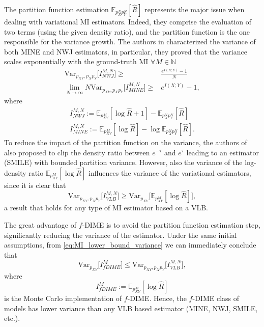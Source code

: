 The partition function estimation $\mathbb{E}_{p^N_X p^N_Y}[\hat{R}]$ represents the major issue when dealing with variational MI estimators. Indeed, they comprise the evaluation of two terms (using the given density ratio), and the partition function is the one responsible for the variance growth. The authors in \cite{Song2020} characterized the variance of both MINE and NWJ estimators, in particular, they proved that the variance scales exponentially with the ground-truth MI $\forall M \in \mathbb{N}$
\begin{align}
\label{eq:MI_exponentially_increasing_variance}
\text{Var}_{p_{XY},p_Xp_Y}\bigl[ I^{M,N}_{NWJ}\bigr] \geq & \frac{e^{I(X;Y)}-1}{N} \nonumber \\
\lim_{N \to \infty} N\text{Var}_{p_{XY},p_Xp_Y}\bigl[ I^{M,N}_{MINE}\bigr] \geq & e^{I(X;Y)}-1,
\end{align}
where
\begin{align}
I^{M,N}_{NWJ}:= \mathbb{E}_{p^M_{XY}}[\log \hat{R} +1] - \mathbb{E}_{p^N_Xp^N_Y}[\hat{R}]   \nonumber \\
 I^{M,N}_{MINE}:= \mathbb{E}_{p^M_{XY}}[\log \hat{R}] - \log \mathbb{E}_{p^N_Xp^N_Y}[\hat{R}].   
\end{align}
To reduce the impact of the partition function on the variance, the authors of \cite{Song2020} also proposed to clip the density ratio between $e^{-\tau}$ and $e^{\tau}$ leading to an estimator (SMILE) with bounded partition variance. However, also the variance of the log-density ratio $\mathbb{E}_{p^M_{XY}}[\log \hat{R}]$ influences the variance of the variational estimators, since it is clear that
\begin{equation}
\text{Var}_{p_{XY},p_Xp_Y}\bigl[ I^{M,N}_{VLB}\bigr] \geq \text{Var}_{p_{XY}}\bigl[ \mathbb{E}_{p^M_{XY}}[\log \hat{R}] \bigr],
\label{eq:MI_lower_bound_variance}
\end{equation}
a result that holds for any type of MI estimator based on a VLB.

The great advantage of $f$-DIME is to avoid the partition function estimation step, significantly reducing the variance of the estimator. Under the same initial assumptions, from \eqref{eq:MI_lower_bound_variance} we can immediately conclude that
\begin{equation}
\text{Var}_{p_{XY}}\bigl[I^{M}_{fDIME}\bigr] \leq \text{Var}_{p_{XY},p_Xp_Y}\bigl[ I^{M,N}_{VLB}\bigr],
\end{equation}
where
\begin{equation}
\label{eq:MI_f_dime_estimator}
I^{M}_{fDIME}:= \mathbb{E}_{p^M_{XY}}[\log \hat{R}]    
\end{equation}
is the Monte Carlo implementation of $f$-DIME. Hence, the $f$-DIME class of models has lower variance than any VLB based estimator (MINE, NWJ, SMILE, etc.). 

